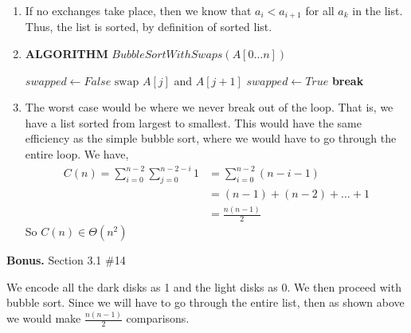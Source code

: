 \documentclass[letterpaper, 11pt]{article}
\newcommand{\hwnumbersec}[3]{\medskip \noindent\textbf{#1.} Section #2 \##3 \smallskip}
\newcommand{\Alg}[1]{\medskip \noindent\textbf{ALGORITHM} \( #1 \)}
\newcommand{\To}{\textbf{ to }}
\begin{document}
\begin{enumerate}[label = (\alph*)]
  \item If no exchanges take place, then we know that \(a_i < a_{i + 1}\) for
    all \(a_k\) in the list. Thus, the list is sorted, by definition of sorted
    list. 
  \item 
    \Alg{BubbleSortWithSwaps(A[0 \dots n])}
    \begin{algorithmic}
      \State \(swapped \gets False\)
      \For{\(i \gets 0 \To n - 2\)}
      \For{\(j \gets 0 \To n - 2 - i\)}
        \State \(\text{swap } A[j] \text{ and } A[j + 1]\)
        \State \(swapped \gets True\)
        \EndIf
      \EndFor
      \State \textbf{break}
      \EndIf
      \EndFor
    \end{algorithmic}

    \newpage
  \item The worst case would be where we never break out of the loop. That is,
    we have a list sorted from largest to smallest. This would have the same
    efficiency as the simple bubble sort, where we would have to go through the
    entire loop. We have,
    \begin{align*}
      C(n) = \sum_{i = 0}^{n-2}\sum_{j = 0}^{n - 2 - i} 1 &= \sum_{i = 0}^{n -
      2} (n - i - 1) \\
           &= (n -1) + (n - 2) + \dots + 1\\
           &= \frac{n(n - 1)}{2}
    \end{align*}
    So \(C(n) \in \Theta(n^2)\)
\end{enumerate}

\hwnumbersec{Bonus}{3.1}{14}

We encode all the dark disks as 1 and the light disks as 0. We then proceed
with bubble sort. Since we will have to go through the entire list, then as
shown above we would make \(\frac{n(n - 1)}{2}\) comparisons. 
\end{document}
